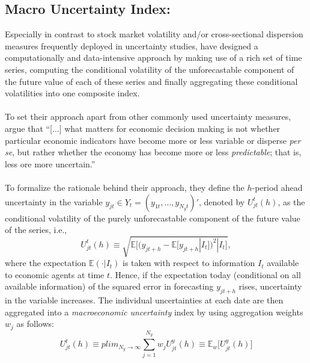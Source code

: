 \documentclass[a4paper,12pt,oneside,pointednumbers,bibtotoc,bigheadings,liststotoc]{scrbook}
\begin{document}
\subsection{Macro Uncertainty Index: \citet{juradoetal:15}}
\label{sec:macrouncertainty}
Especially in contrast to stock market volatility and/or cross-sectional dispersion measures frequently deployed in uncertainty studies, \citet{juradoetal:15} have designed a computationally and data-intensive approach by making use of a rich set of time series, computing the conditional volatility of the unforecastable component of the future value of each of these series and finally aggregating these conditional volatilities into one composite index.\\
\\
To set their approach apart from other commonly used uncertainty measures, \citet[p. 1178]{juradoetal:15} argue that ``[...] what matters for economic decision making is not whether particular economic indicators have become more or less variable or disperse \textit{per se}, but rather whether the economy has become more or less \textit{predictable}; that is, less ore more uncertain.''\\
\\
To formalize the rationale behind their approach, they define the $h$-period ahead uncertainty in the variable $y_{jt} \in Y_t = (y_{1t}, \ldots, y_{N_{y}t})'$, denoted by $U^t_{jt}(h)$, as the conditional volatility of the purely unforecastable component of the future value of the series, i.e.,
\begin{equation} \label{eq:juradoetal_1}
U^t_{jt}(h) \equiv \sqrt{\mathbb{E}\Big[(y_{jt+h} - \mathbb{E}[y_{jt+h}|I_t])^2|I_t\Big]},
\end{equation}
where the expectation $\mathbb{E}(\cdot|I_t)$ is taken with respect to information $I_t$ available to economic agents at time $t$. Hence, if the expectation today (conditional on all available information) of the squared error in forecasting $y_{jt+h}$ rises, uncertainty in the variable increases. The individual uncertainties at each date are then aggregated into a \textit{macroeconomic uncertainty} index by using aggregation weights $w_j$ as follows:
\begin{equation} \label{eq:juradoetal_2}
U^t_{jt}(h) \equiv plim_{N_{y}\to\infty} \sum_{j=1}^{N_y} w_j U_{jt}^y(h) \equiv \mathbb{E}_w \Big[U_{jt}^y(h)\Big]
\end{equation}
\end{document}
